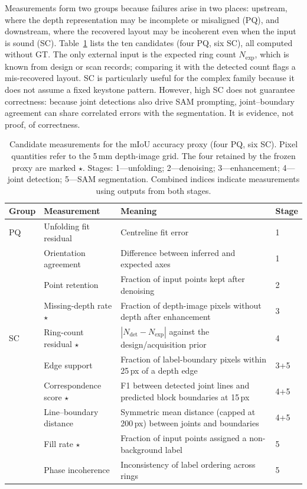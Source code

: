 \documentclass[a4paper,fleqn]{cas-dc}
\begin{document}
{Measurements form two groups because failures arise in two places: upstream, where the depth representation may be incomplete or misaligned (PQ), and downstream, where the recovered layout may be incoherent even when the input is sound (SC). Table~\ref{tab:candidate-features} lists the ten candidates (four PQ, six SC), all computed without GT. The only external input is the expected ring count $N_{\mathrm{exp}}$, which is known from design or scan records; comparing it with the detected count flags a mis-recovered layout. SC is particularly useful for the complex family because it does not assume a fixed keystone pattern. However, high SC does not guarantee correctness: because joint detections also drive SAM prompting, joint--boundary agreement can share correlated errors with the segmentation. It is evidence, not proof, of correctness.

\begin{table}[t]
\caption{Candidate measurements for the mIoU accuracy proxy (four PQ, six SC). Pixel quantities refer to the 5\,mm depth-image grid. The four retained by the frozen proxy are marked $\star$. Stages: 1---unfolding; 2---denoising; 3---enhancement; 4---joint detection; 5---SAM segmentation. Combined indices indicate measurements using outputs from both stages.}
\label{tab:candidate-features}
\centering
\small
\setlength{\tabcolsep}{3pt}
\begin{tabular}{p{} p{} p{} p{}}
\toprule
Group & Measurement & Meaning & Stage \\
\midrule
PQ & Unfolding fit residual & Centreline fit error & 1 \\
 & Orientation agreement & Difference between inferred and expected axes & 1 \\
 & Point retention & Fraction of input points kept after denoising & 2 \\
 & Missing-depth rate $\star$ & Fraction of depth-image pixels without depth after enhancement & 3 \\
SC & Ring-count residual $\star$ & $|N_{\mathrm{det}}-N_{\mathrm{exp}}|$ against the design/acquisition prior & 4 \\
 & Edge support & Fraction of label-boundary pixels within 25\,px of a depth edge & 3+5 \\
 & Correspondence score $\star$ & F1 between detected joint lines and predicted block boundaries at 15\,px & 4+5 \\
 & Line--boundary distance & Symmetric mean distance (capped at 200\,px) between joints and boundaries & 4+5 \\
 & Fill rate $\star$ & Fraction of input points assigned a non-background label & 5 \\
 & Phase incoherence & Inconsistency of label ordering across rings & 5 \\
\bottomrule
\end{tabular}
\end{table}

}
\end{document}
